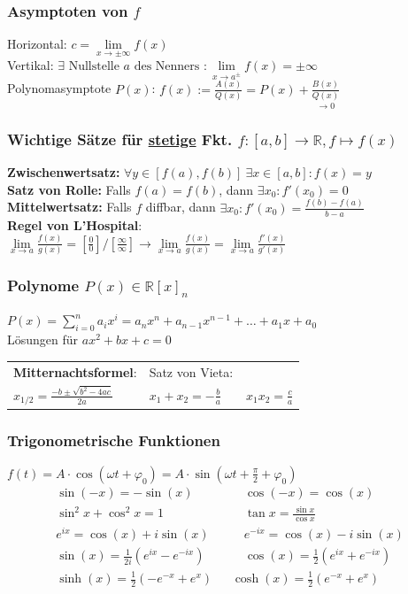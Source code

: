 \documentclass[6pt,a4paper]{scrartcl}
\newcommand{\enbrace}[1]{\ensuremath{\left(#1\right)}}
\newcommand{\ra}[0]{\ensuremath{\rightarrow}}
\begin{document}
\begin{multicols*}{4}
\subsubsection{Asymptoten von $f$}
Horizontal: $c=\lim\limits_{x\ra \pm \infty} f(x)$\\
Vertikal: $\exists \text{ Nullstelle } a \text{ des Nenners }: \lim\limits_{x \rightarrow a^{\pm}} f(x) = \pm \infty$\\
Polynomasymptote $P(x)$: $f(x):=\frac{A(x)}{Q(x)}=P(x)+ \underset{\ra 0}{\frac{B(x)}{Q(x)}}$ \\
\subsubsection{Wichtige Sätze für \underline{stetige} Fkt. $f: [a,b] \rightarrow \mathbb R, f \mapsto f(x)$ }
\textbf{Zwischenwertsatz:} $\forall y \in [f(a),f(b)]\ \exists x\in [a,b]:f(x)=y$\\
\textbf{Satz von Rolle:} Falls $f(a)=f(b)$, dann $\exists x_0: f' (x_0) = 0$\\
\textbf{Mittelwertsatz:} Falls $f$ diffbar, dann $\exists x_0:f'(x_0)=\frac{f(b)-f(a)}{b-a}$\\
\textbf{Regel von L'Hospital}:\\ $\lim\limits_{x \rightarrow a} \frac{f(x)}{g(x)} = \left[ \frac{0}{0} \right] / \left[ \frac{\infty}{\infty} \right] \rightarrow \lim\limits_{x \rightarrow a} \frac{f(x)}{g(x)} = \lim\limits_{x \rightarrow a} \frac{f'(x)}{g'(x)}$

\subsubsection{Polynome $P(x)\in\mathbb R[x]_n$}
$P(x)=\sum_{i=0}^n a_ix^i=a_n x^n+a_{n-1} x^{n-1}+\dotsc+a_1x+a_0$ \\
Lösungen für $ax^2+bx+c=0$ \\
\begin{tabular}{l|l}
\textbf{Mitternachtsformel}:  &  Satz von Vieta:\\
$x_{1/2}=\frac{-b\pm\sqrt{b^2-4ac}}{2a}$  \quad & \quad   $x_1 + x_2 = - \frac{b}{a} \qquad x_1 x_2 = \frac{c}{a}$
\end{tabular}

\subsubsection{Trigonometrische Funktionen}
$f(t)=A\cdot \cos(\omega t + \varphi_0)=A\cdot \sin(\omega t + \frac{\pi}{2}+ \varphi_0)$
\begin{eqnarray*}
	\sin (-x) = -\sin (x)  \quad & \quad \cos (-x) = \cos (x) \\
	\sin^2 x + \cos^2 x = 1  \quad & \quad \tan x = \frac{\sin x}{\cos x} \\
	e^{ix}=\cos(x)+i\sin(x) \quad & \quad e^{-ix}=\cos(x)-i\sin(x) \\
	\sin(x)=\frac{1}{2i}\enbrace{e^{ix}-e^{-ix}} \quad & \quad \cos(x)=\frac{1}{2}\enbrace{e^{ix}+e^{-ix}} \\
	\sinh(x)=\frac{1}{2}(-e^{-x}+e^x) & \cosh(x)=\frac{1}{2}(e^{-x}+e^x)
\end{eqnarray*}

\end{multicols*}
\end{document}
